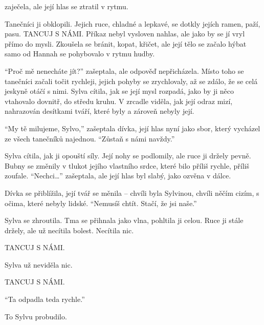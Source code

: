 \documentclass[10pt]{article}
\begin{document}
\begin{spacing}{1}
zaječela, ale její hlas se ztratil v rytmu.\par Tanečníci ji obklopili. Jejich ruce, chladné a lepkavé, se dotkly jejích ramen, paží, pasu. \textsc{TANCUJ S NÁMI.} Příkaz nebyl vysloven nahlas, ale jako by se jí vryl přímo do mysli. Zkoušela se bránit, kopat, křičet, ale její tělo se začalo hýbat samo od Hannah se pohybovalo v rytmu hudby. \par \enquote{Proč mě nenecháte jít?} zašeptala, ale odpověď nepřicházela. Místo toho se tanečníci začali točit rychleji, jejich pohyby se zrychlovaly, až se zdálo, že se celá jeskyně otáčí s nimi. Sylva cítila, jak se její mysl rozpadá, jako by ji něco vtahovalo dovnitř, do středu kruhu. V zrcadle viděla, jak její odraz mizí, nahrazován desítkami tváří, které byly a zároveň nebyly její.\par \enquote{My tě milujeme, Sylvo,} zašeptala dívka, její hlas nyní jako sbor, který vycházel ze všech tanečníků najednou. \enquote{Zůstaň s námi navždy.}\par Sylva cítila, jak ji opouští síly. Její nohy se podlomily, ale ruce ji držely pevně. Bubny se změnily v tlukot jejího vlastního srdce, které bilo příliš rychle, příliš zoufale. \enquote{Nechci…} zašeptala, ale její hlas byl slabý, jako ozvěna v dálce.\par Dívka se přiblížila, její tvář se měnila – chvíli byla Sylvinou, chvíli něčím cizím, s očima, které nebyly lidské. \enquote{Nemusíš chtít. Stačí, že jsi naše.}\par Sylva se zhroutila. Tma se přihnala jako vlna, pohltila ji celou. Ruce ji stále držely, ale už necítila bolest. Necítila nic.\par \fontsize{8pt}{9pt}\selectfont \textsc{TANCUJ S NÁMI.}\par \fontsize{7pt}{8pt}\selectfont Sylva už neviděla nic.\par \fontsize{6pt}{7pt}\selectfont \textsc{TANCUJ S NÁMI.}\par \fontsize{6pt}{6pt}\selectfont \enquote{Ta odpadla teda rychle.}\par To Sylvu probudilo.\par
\end{spacing}
\end{document}
